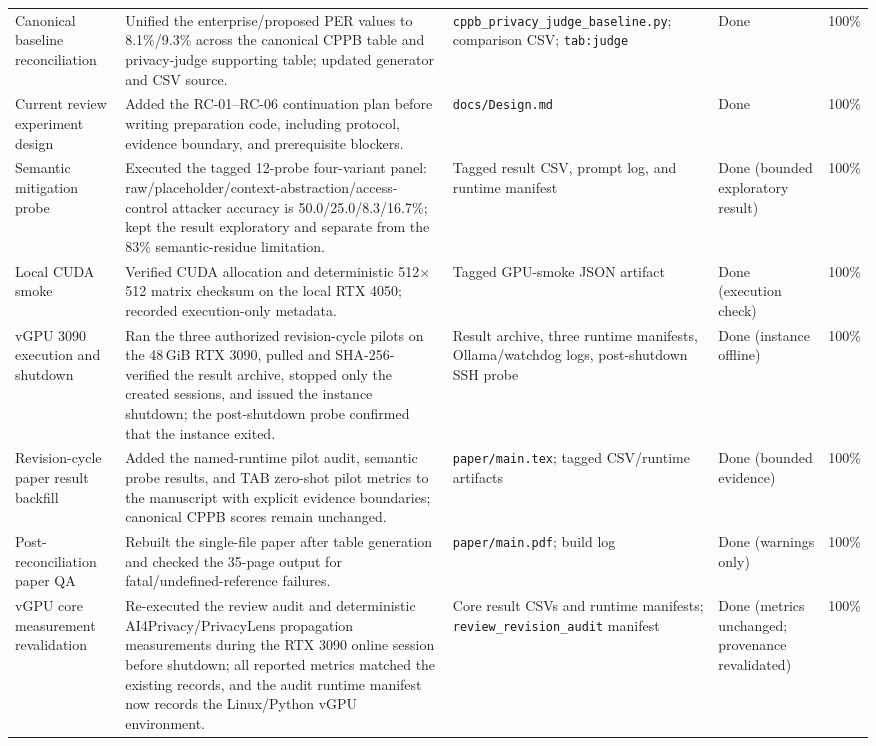 \documentclass[11pt]{article}
\begin{document}
\begin{longtable}{p{}p{}p{}p{}p{}}
Canonical baseline reconciliation & Unified the enterprise/proposed PER values to 8.1\%/9.3\% across the canonical CPPB table and privacy-judge supporting table; updated generator and CSV source. & \texttt{cppb\_privacy\_judge\_baseline.py}; comparison CSV; \texttt{tab:judge} & Done & 100\% \\
Current review experiment design & Added the RC-01--RC-06 continuation plan before writing preparation code, including protocol, evidence boundary, and prerequisite blockers. & \texttt{docs/Design.md} & Done & 100\% \\
Semantic mitigation probe & Executed the tagged 12-probe four-variant panel: raw/placeholder/context-abstraction/access-control attacker accuracy is 50.0/25.0/8.3/16.7\%; kept the result exploratory and separate from the 83\% semantic-residue limitation. & Tagged result CSV, prompt log, and runtime manifest & Done (bounded exploratory result) & 100\% \\
Local CUDA smoke & Verified CUDA allocation and deterministic 512$\times$512 matrix checksum on the local RTX 4050; recorded execution-only metadata. & Tagged GPU-smoke JSON artifact & Done (execution check) & 100\% \\
vGPU 3090 execution and shutdown & Ran the three authorized revision-cycle pilots on the 48\,GiB RTX 3090, pulled and SHA-256-verified the result archive, stopped only the created sessions, and issued the instance shutdown; the post-shutdown probe confirmed that the instance exited. & Result archive, three runtime manifests, Ollama/watchdog logs, post-shutdown SSH probe & Done (instance offline) & 100\% \\
Revision-cycle paper result backfill & Added the named-runtime pilot audit, semantic probe results, and TAB zero-shot pilot metrics to the manuscript with explicit evidence boundaries; canonical CPPB scores remain unchanged. & \texttt{paper/main.tex}; tagged CSV/runtime artifacts & Done (bounded evidence) & 100\% \\
Post-reconciliation paper QA & Rebuilt the single-file paper after table generation and checked the 35-page output for fatal/undefined-reference failures. & \texttt{paper/main.pdf}; build log & Done (warnings only) & 100\% \\
vGPU core measurement revalidation & Re-executed the review audit and deterministic AI4Privacy/PrivacyLens propagation measurements during the RTX 3090 online session before shutdown; all reported metrics matched the existing records, and the audit runtime manifest now records the Linux/Python vGPU environment. & Core result CSVs and runtime manifests; \texttt{review\_revision\_audit} manifest & Done (metrics unchanged; provenance revalidated) & 100\% \\

\end{longtable}
\end{document}
